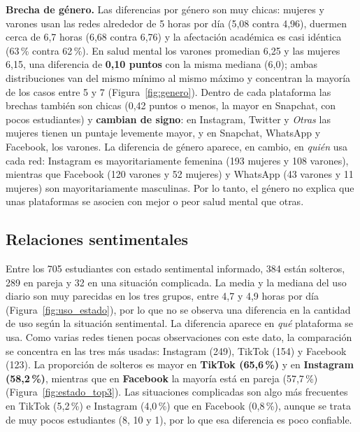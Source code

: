 \documentclass[10pt,a4paper]{article}
\begin{document}
\textbf{Brecha de género.} Las diferencias por género son muy chicas: mujeres y varones usan las redes
alrededor de 5 horas por día (5,08 contra 4,96), duermen cerca de 6,7 horas (6,68 contra 6,76) y la
afectación académica es casi idéntica (63\,\% contra 62\,\%). En salud mental los varones promedian 6,25 y
las mujeres 6,15, una diferencia de \textbf{0,10 puntos} con la misma mediana (6,0); ambas distribuciones
van del mismo mínimo al mismo máximo y concentran la mayoría de los casos entre 5 y 7
(Figura~\ref{fig:genero}). Dentro de cada plataforma las brechas también son chicas (0,42 puntos o menos,
la mayor en Snapchat, con pocos estudiantes) y \textbf{cambian de signo}: en Instagram, Twitter y
\emph{Otras} las mujeres tienen un puntaje levemente mayor, y en Snapchat, WhatsApp y Facebook, los
varones. La diferencia de género aparece, en cambio, en \emph{quién} usa cada red: Instagram es
mayoritariamente femenina (193 mujeres y 108 varones), mientras que Facebook (120 varones y 52 mujeres) y
WhatsApp (43 varones y 11 mujeres) son mayoritariamente masculinas. Por lo tanto, el género no explica que
unas plataformas se asocien con mejor o peor salud mental que otras.

\subsection{Relaciones sentimentales}

Entre los 705 estudiantes con estado sentimental informado, 384 están solteros, 289 en pareja y 32 en
una situación complicada. La media y la mediana del uso diario son muy parecidas en los tres grupos, entre
4,7 y 4,9 horas por día (Figura~\ref{fig:uso_estado}), por lo que no se observa una diferencia en la
cantidad de uso según la situación sentimental. La diferencia aparece en \emph{qué} plataforma se usa.
Como varias redes tienen pocas observaciones con este dato, la comparación se concentra en las tres más
usadas: Instagram (249), TikTok (154) y Facebook (123). La proporción de solteros es mayor en
\textbf{TikTok (65,6\,\%)} y en \textbf{Instagram (58,2\,\%)}, mientras que en \textbf{Facebook} la mayoría
está en pareja (57,7\,\%) (Figura~\ref{fig:estado_top3}). Las situaciones complicadas son algo más
frecuentes en TikTok (5,2\,\%) e Instagram (4,0\,\%) que en Facebook (0,8\,\%), aunque se trata de muy pocos
estudiantes (8, 10 y 1), por lo que esa diferencia es poco confiable.
\end{document}
